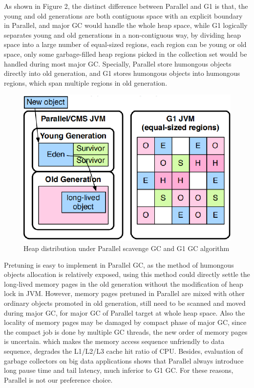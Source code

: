 \documentclass[sigplan, screen]{acmart}
\begin{document}
As shown in Figure 2, the distinct difference between Parallel and G1 is that, the young and old generations are both contiguous space with an explicit boundary in Parallel, and major GC would handle the whole heap space, while G1 logically separates young and old generations in a non-contiguous way, by dividing
heap space into a large number of equal-sized regions, each region can be young or old space, only some garbage-filled heap regions picked in the collection
 set would be handled during most major GC. Specially, Parallel store humongous objects directly into old generation, and G1 stores humongous objects 
 into humongous regions, which span multiple regions in old generation.
\begin{figure}[h]
  \centering
  \includegraphics[width=\linewidth]{figures/GCalgorithm}
  \caption{Heap distribution under Parallel scavenge GC and G1 GC algorithm}
\end{figure}
Pretuning is easy to implement in Parallel GC, as the method of humongous objects allocation is relatively exposed, using this method could directly settle the
long-lived memory pages in the old generation without the modification of heap lock in JVM. However, memory pages pretuned in Parallel are mixed with other
ordinary objects promoted in old generation, still need to be scanned and moved during major GC, for major GC of Parallel target at whole heap space. Also the 
locality of memory pages may be damaged by compact phase of major GC, since the compact job is done by multiple GC threads, the new order of memory pages is uncertain.
which makes the memory access sequence unfriendly to data sequence, degrades the L1/L2/L3 cache hit ratio of CPU. Besides, evaluation of garbage collectors on big
data applications shows that Parallel always introduce long pause time and tail latency\cite{xu2019experimental,suo2018characterizing,yu2016performance,li2019scissorgc},
much inferior to G1 GC. For these reasons, Parallel is not our preference choice. 
\end{document}
